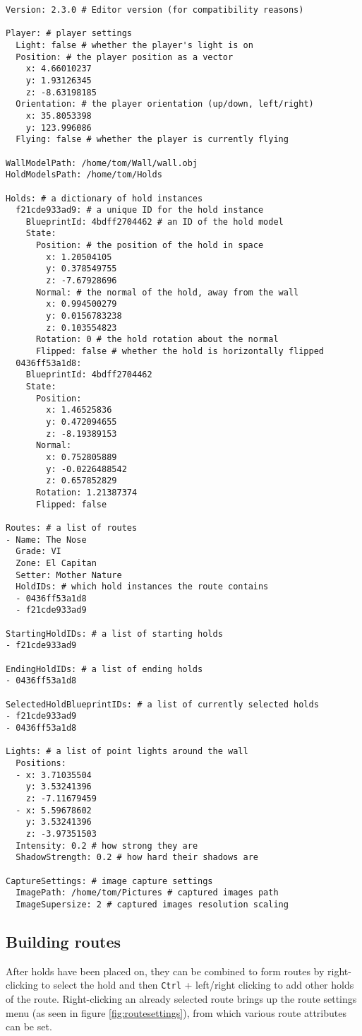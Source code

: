 \begin{verbatim}
Version: 2.3.0 # Editor version (for compatibility reasons)

Player: # player settings
  Light: false # whether the player's light is on
  Position: # the player position as a vector
    x: 4.66010237
    y: 1.93126345
    z: -8.63198185
  Orientation: # the player orientation (up/down, left/right)
    x: 35.8053398
    y: 123.996086
  Flying: false # whether the player is currently flying

WallModelPath: /home/tom/Wall/wall.obj
HoldModelsPath: /home/tom/Holds

Holds: # a dictionary of hold instances
  f21cde933ad9: # a unique ID for the hold instance
    BlueprintId: 4bdff2704462 # an ID of the hold model
    State:
      Position: # the position of the hold in space
        x: 1.20504105
        y: 0.378549755
        z: -7.67928696
      Normal: # the normal of the hold, away from the wall
        x: 0.994500279
        y: 0.0156783238
        z: 0.103554823
      Rotation: 0 # the hold rotation about the normal
      Flipped: false # whether the hold is horizontally flipped
  0436ff53a1d8:
    BlueprintId: 4bdff2704462
    State:
      Position:
        x: 1.46525836
        y: 0.472094655
        z: -8.19389153
      Normal:
        x: 0.752805889
        y: -0.0226488542
        z: 0.657852829
      Rotation: 1.21387374
      Flipped: false

Routes: # a list of routes
- Name: The Nose
  Grade: VI
  Zone: El Capitan
  Setter: Mother Nature
  HoldIDs: # which hold instances the route contains
  - 0436ff53a1d8
  - f21cde933ad9

StartingHoldIDs: # a list of starting holds
- f21cde933ad9

EndingHoldIDs: # a list of ending holds
- 0436ff53a1d8

SelectedHoldBlueprintIDs: # a list of currently selected holds
- f21cde933ad9
- 0436ff53a1d8

Lights: # a list of point lights around the wall
  Positions:
  - x: 3.71035504
    y: 3.53241396
    z: -7.11679459
  - x: 5.59678602
    y: 3.53241396
    z: -3.97351503
  Intensity: 0.2 # how strong they are
  ShadowStrength: 0.2 # how hard their shadows are

CaptureSettings: # image capture settings
  ImagePath: /home/tom/Pictures # captured images path
  ImageSupersize: 2 # captured images resolution scaling
\end{verbatim}

\subsection{Building routes}
After holds have been placed on, they can be combined to form routes by right-clicking to select the hold and then \verb|Ctrl| + left/right clicking to add other holds of the route.
Right-clicking an already selected route brings up the route settings menu (as seen in figure \ref{fig:routesettings}), from which various route attributes can be set.

